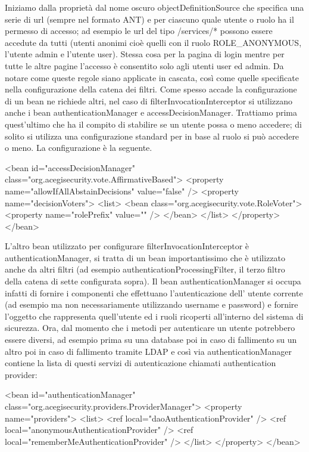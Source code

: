 Iniziamo dalla proprietà dal nome oscuro  objectDefinitionSource che specifica una serie di url (sempre nel formato ANT) e per ciascuno quale utente o ruolo ha il permesso di accesso; ad esempio le url del tipo /services/* possono essere accedute da tutti (utenti anonimi cioè quelli con il ruolo ROLE\_ANONYMOUS, l'utente admin e l'utente user). Stessa cosa per la pagina di login mentre per tutte le altre pagine l'accesso è consentito solo agli utenti user ed admin. Da notare come queste regole siano applicate in cascata, così come quelle specificate nella configurazione della catena dei filtri. 
Come spesso accade la configurazione di un bean ne richiede altri, nel caso di   filterInvocationInterceptor si utilizzano anche i bean  authenticationManager e  accessDecisionManager. Trattiamo prima quest'ultimo che ha il compito di stabilire  se un utente possa o meno accedere; di solito si utilizza una configurazione standard per in base al ruolo si può accedere o meno. La configurazione è la seguente.

\begin{xml}
<bean id="accessDecisionManager"
  class="org.acegisecurity.vote.AffirmativeBased">
  <property name="allowIfAllAbstainDecisions" value="false" />
  <property name="decisionVoters">
    <list>
      <bean class="org.acegisecurity.vote.RoleVoter">
        <property name="rolePrefix" value="" />
      </bean>
    </list>
  </property>
</bean>
\end{xml}

L'altro bean utilizzato per configurare  filterInvocationInterceptor è  authenticationManager, si tratta di un bean importantissimo che è utilizzato anche da altri filtri (ad esempio  authenticationProcessingFilter, il terzo filtro della catena di sette configurata sopra). Il bean  authenticationManager si occupa infatti di fornire i componenti che effettuano l'autenticazione dell' utente corrente (ad esempio ma non necessariamente utilizzando username e password) e fornire l'oggetto che rappresenta quell'utente ed i ruoli ricoperti all'interno del sistema di sicurezza. Ora, dal momento che i metodi per autenticare un utente potrebbero essere diversi, ad esempio prima su una database poi in caso di fallimento su un altro poi in caso di fallimento tramite LDAP e così via  authenticationManager contiene la lista di questi servizi di autenticazione chiamati authentication provider:

\begin{xml}
<bean id="authenticationManager"
  class="org.acegisecurity.providers.ProviderManager">
  <property name="providers">
    <list>
       <ref local="daoAuthenticationProvider" />
       <ref local="anonymousAuthenticationProvider" />
       <ref local="rememberMeAuthenticationProvider" />
    </list>
  </property>
</bean>
\end{xml}

